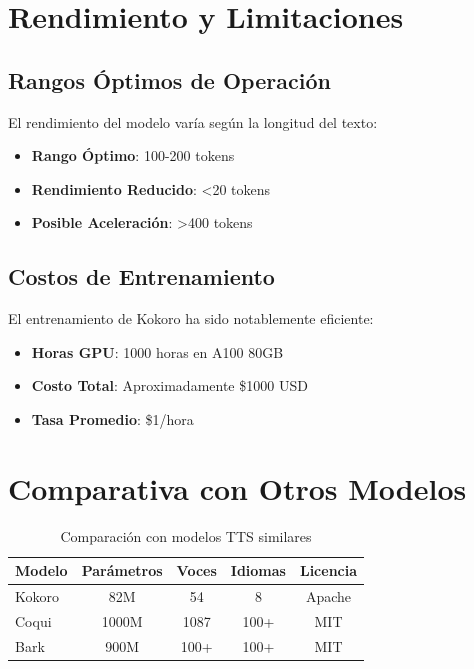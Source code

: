 \section{Rendimiento y Limitaciones}
\label{sec:performance}

\subsection{Rangos Óptimos de Operación}
\label{subsec:optimal-ranges}

El rendimiento del modelo varía según la longitud del texto:
\begin{itemize}
	\item \textbf{Rango Óptimo}: 100-200 tokens
	\item \textbf{Rendimiento Reducido}: <20 tokens
	\item \textbf{Posible Aceleración}: >400 tokens
\end{itemize}

\subsection{Costos de Entrenamiento}
\label{subsec:training-costs}

El entrenamiento de Kokoro ha sido notablemente eficiente:
\begin{itemize}
	\item \textbf{Horas GPU}: 1000 horas en A100 80GB
	\item \textbf{Costo Total}: Aproximadamente \$1000 USD
	\item \textbf{Tasa Promedio}: \$1/hora
\end{itemize}

\section{Comparativa con Otros Modelos}
\label{sec:model-comparison}

\begin{table}[H]
	\centering
	\label{tab:model-comparison}
	\begin{tabular}{|l|c|c|c|c|}
		\hline
		\textbf{Modelo} & \textbf{Parámetros} & \textbf{Voces} & \textbf{Idiomas} & \textbf{Licencia} \\
		\hline
		Kokoro          & 82M                 & 54             & 8                & Apache            \\
		\hline
		Coqui           & 1000M               & 1087           & 100+             & MIT               \\
		\hline
		Bark            & 900M                & 100+           & 100+             & MIT               \\
		\hline
	\end{tabular}
	\caption{Comparación con modelos TTS similares}
\end{table}